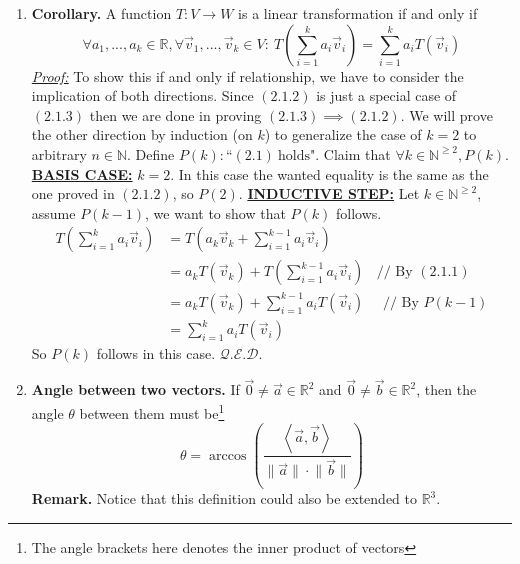 \documentclass[oneside, 12pt]{book}
\newcommand{\settag}[1]{\renewcommand{\theenumi}{#1}}
\newcommand{\R}{\mathbb{R}}
\newcommand{\double}[1]{\mathbb{#1}} %
\newcommand{\qed}{\hfill $\mathcal{Q}.\mathcal{E}.\mathcal{D}.$}
\newcommand{\tbf}[1]{\textbf{#1}}
\newcommand{\tit}[1]{\textit{#1}}
\begin{document}
\begin{enumerate}
        \settag{2.1.3}
        \item \tbf{Corollary.} A function $T:V\xrightarrow{}W$ is a linear transformation if and only if
        \begin{equation}
            \forall a_1,...,a_k\in \R, \forall \vec{v}_1, ...,\vec{v}_k\in V:~ 
            T\left(\sum_{i=1}^{k}a_i\vec{v}_i\right) = \sum_{i=1}^{k}a_i T\left(\vec{v}_i\right)
        \end{equation}
        \tit{\underline{Proof:}} To show this if and only if relationship, we have to consider the implication of both directions. Since $(2.1.2)$ is just a special case of $(2.1.3)$ then we are done in proving $(2.1.3)\implies (2.1.2)$. We will prove the other direction by induction (on $k$) to generalize the case of $k=2$ to arbitrary $n\in \double{N}$. \newline
        Define $P(k): \text{``}(2.1)~\text{holds"}$. \newline
        Claim that $\forall k \in \double{N}^{\geq 2}, P(k)$.\newline
        \tbf{\underline{BASIS CASE:}} $k = 2$. In this case the wanted equality is the same as the one proved in $(2.1.2)$, so $P(2)$. \newline
        \tbf{\underline{INDUCTIVE STEP:}} Let $k\in \double{N}^{\geq 2}$, assume $P(k-1)$, we want to show that $P(k)$ follows.\newline
        \begin{align*}
            T\left(\sum_{i=1}^{k}a_i\vec{v}_i\right) &= T\left(a_k\vec{v}_k + \sum_{i=1}^{k-1}a_i\vec{v}_i\right) \\
            &= a_k T(\vec{v}_k) + T\left(\sum_{i=1}^{k-1}a_i\vec{v}_i\right)~~~~\text{// By $(2.1.1)$} \\
            &= a_k T(\vec{v}_k) + \sum_{i=1}^{k-1}a_i T\left(\vec{v}_i\right)~~~~~~\text{// By $P(k-1)$}\\
            &= \sum_{i=1}^{k}a_i T\left(\vec{v}_i\right)
        \end{align*}
        So $P(k)$ follows in this case.
        \qed
        
        \settag{2.1.9}
        \item \tbf{Angle between two vectors.} If $\vec{0}\neq \vec{a}\in \R^2$ and $\vec{0}\neq \vec{b}\in \R^2$, then the angle $\theta$ between them must be\footnote{The angle brackets here denotes the inner product of vectors}
        \begin{equation*}
            \theta = \arccos\left( \frac{\left<\vec{a},\vec{b}\right>}{\lVert\vec{a}\rVert \cdot \lVert\vec{b}\rVert}\right)
        \end{equation*}
        \tbf{Remark.} Notice that this definition could also be extended to $\R^3$.
        

\end{enumerate}
\end{document}
